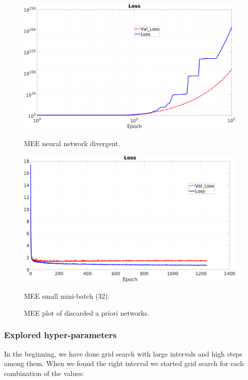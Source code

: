 \begin{figure}[H]
	\centering
	\begin{minipage}[t]{0.5\linewidth}
		\includegraphics[width=\linewidth]{img/Cup_loss_divergente.png}
		\caption{MEE neural network divergent.}
		\label{img:hlr}
	\end{minipage}%
	\begin{minipage}[t]{0.5\linewidth}
		\includegraphics[width=\linewidth]{img/Cup_loss_noSmooth.png}
		\caption{MEE small mini-batch (32).}
		\label{img:smb}
	\end{minipage}
		\caption{MEE plot of discarded a priori networks.}
\end{figure}

\subsubsection{Explored hyper-parameters}
In the beginning, we have done grid search with large intervals and high steps among them. When we found the right interval we started grid search for each combination of the values:

